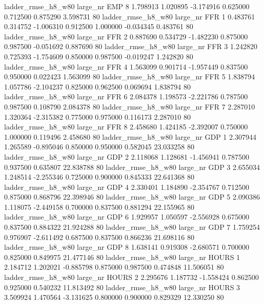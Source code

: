  ladder_rmse_h8_w80   large_nr      EMP                 8  1.798913  1.020895  -3.174916 0.625000 0.712500  0.875290    3.598731 80
 ladder_rmse_h8_w80   large_nr      FFR                 1  0.483761  0.314752  -1.006310 0.912500 1.000000 -0.034345    0.483761 80
 ladder_rmse_h8_w80   large_nr      FFR                 2  0.887690  0.534729  -1.482230 0.875000 0.987500 -0.051692    0.887690 80
 ladder_rmse_h8_w80   large_nr      FFR                 3  1.242820  0.725393  -1.754609 0.850000 0.987500 -0.019247    1.242820 80
 ladder_rmse_h8_w80   large_nr      FFR                 4  1.563099  0.901714  -1.957449 0.837500 0.950000  0.022423    1.563099 80
 ladder_rmse_h8_w80   large_nr      FFR                 5  1.838794  1.057786  -2.104237 0.825000 0.962500  0.069694    1.838794 80
 ladder_rmse_h8_w80   large_nr      FFR                 6  2.084378  1.198573  -2.221786 0.787500 0.987500  0.108790    2.084378 80
 ladder_rmse_h8_w80   large_nr      FFR                 7  2.287010  1.320364  -2.315382 0.775000 0.975000  0.116173    2.287010 80
 ladder_rmse_h8_w80   large_nr      FFR                 8  2.458680  1.424185  -2.392007 0.750000 1.000000  0.119496    2.458680 80
 ladder_rmse_h8_w80   large_nr      GDP                 1  2.307944  1.265589  -0.895046 0.850000 0.950000  0.582045   23.033258 80
 ladder_rmse_h8_w80   large_nr      GDP                 2  2.118068  1.128681  -1.456941 0.787500 0.937500  0.635807   22.838788 80
 ladder_rmse_h8_w80   large_nr      GDP                 3  2.655034  1.248514  -2.255346 0.725000 0.900000  0.845333   22.641368 80
 ladder_rmse_h8_w80   large_nr      GDP                 4  2.330401  1.184890  -2.354767 0.712500 0.875000  0.868796   22.398946 80
 ladder_rmse_h8_w80   large_nr      GDP                 5  2.090386  1.118075  -2.449158 0.700000 0.837500  0.881294   22.155965 80
 ladder_rmse_h8_w80   large_nr      GDP                 6  1.929957  1.050597  -2.556928 0.675000 0.837500  0.884322   21.924288 80
 ladder_rmse_h8_w80   large_nr      GDP                 7  1.759254  0.976907  -2.611492 0.687500 0.837500  0.866236   21.698116 80
 ladder_rmse_h8_w80   large_nr      GDP                 8  1.638141  0.919308  -2.680571 0.700000 0.825000  0.849975   21.477146 80
 ladder_rmse_h8_w80   large_nr    HOURS                 1  2.184712  1.202021  -0.885798 0.875000 0.987500  0.474848   11.506051 80
 ladder_rmse_h8_w80   large_nr    HOURS                 2  2.295676  1.187732  -1.558424 0.862500 0.925000  0.540232   11.813492 80
 ladder_rmse_h8_w80   large_nr    HOURS                 3  3.509924  1.470564  -3.131625 0.800000 0.900000  0.829329   12.330250 80
